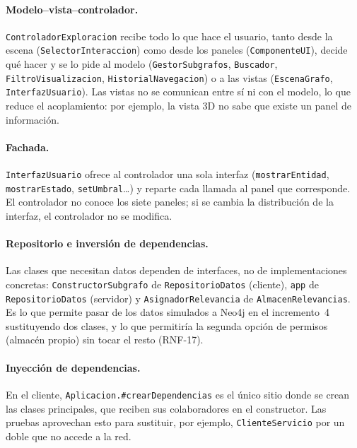 \paragraph{Modelo--vista--controlador.} \texttt{ControladorExploracion} recibe todo lo que hace el usuario, tanto desde la escena (\texttt{SelectorInteraccion}) como desde los paneles (\texttt{ComponenteUI}), decide qué hacer y se lo pide al modelo (\texttt{GestorSubgrafos}, \texttt{Buscador}, \texttt{FiltroVisualizacion}, \texttt{HistorialNavegacion}) o a las vistas (\texttt{EscenaGrafo}, \texttt{InterfazUsuario}). Las vistas no se comunican entre sí ni con el modelo, lo que reduce el acoplamiento: por ejemplo, la vista 3D no sabe que existe un panel de información.

\paragraph{Fachada.} \texttt{InterfazUsuario} ofrece al controlador una sola interfaz (\texttt{mostrarEntidad}, \texttt{mostrarEstado}, \texttt{setUmbral}\ldots) y reparte cada llamada al panel que corresponde. El controlador no conoce los siete paneles; si se cambia la distribución de la interfaz, el controlador no se modifica.

\paragraph{Repositorio e inversión de dependencias.} Las clases que necesitan datos dependen de interfaces, no de implementaciones concretas: \texttt{ConstructorSubgrafo} de \texttt{RepositorioDatos} (cliente), \texttt{app} de \texttt{RepositorioDatos} (servidor) y \texttt{AsignadorRelevancia} de \texttt{AlmacenRelevancias}. Es lo que permite pasar de los datos simulados a Neo4j en el incremento~4 sustituyendo dos clases, y lo que permitiría la segunda opción de permisos (almacén propio) sin tocar el resto (RNF-17).

\paragraph{Inyección de dependencias.} En el cliente, \texttt{Aplicacion.\#crearDependencias} es el único sitio donde se crean las clases principales, que reciben sus colaboradores en el constructor. Las pruebas aprovechan esto para sustituir, por ejemplo, \texttt{ClienteServicio} por un doble que no accede a la red.

